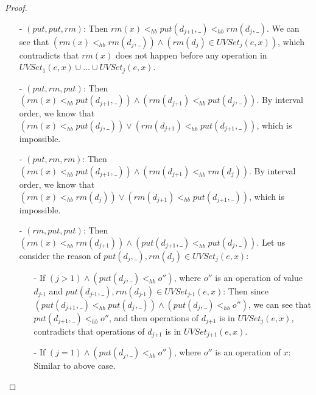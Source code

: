 \begin {proof}
\begin{itemize}
\item[-] $(\textit{put},\textit{put},\textit{rm})$: Then $\textit{rm}(x) <_{hb} \textit{put}(d_{\textit{j+1}},\_) <_{hb} \textit{rm}(d_j,\_)$. We can see that $( \textit{rm}(x) <_{hb} \textit{rm}(d_j,\_) ) \wedge ( \textit{rm}(d_j) \in \textit{UVSet}_j(e,x) )$, which contradicts that $\textit{rm}(x)$ does not happen before any operation in $\textit{UVSet}_1(e,x) \cup \ldots \cup \textit{UVSet}_j(e,x)$.

\item[-] $(\textit{put},\textit{rm},\textit{put})$: Then $( \textit{rm}(x) <_{hb} \textit{put}(d_{\textit{j+1}},\_) ) \wedge ( \textit{rm}(d_{\textit{j+1}}) <_{hb} \textit{put}(d_j,\_) )$. By interval order, we know that $( \textit{rm}(x) <_{hb} \textit{put}(d_j,\_) ) \vee ( \textit{rm}(d_{\textit{j+1}}) <_{hb} \textit{put}(d_{\textit{j+1}},\_) )$, which is impossible.

\item[-] $(\textit{put},\textit{rm},\textit{rm})$: Then $( \textit{rm}(x) <_{hb} \textit{put}(d_{\textit{j+1}},\_) ) \wedge ( \textit{rm}(d_{\textit{j+1}}) <_{hb} \textit{rm}(d_j) )$. By interval order, we know that $( \textit{rm}(x) <_{hb} \textit{rm}(d_j) ) \vee ( \textit{rm}(d_{\textit{j+1}}) <_{hb} \textit{put}(d_{\textit{j+1}},\_) )$, which is impossible.

\item[-] $(\textit{rm},\textit{put},\textit{put})$: Then $( \textit{rm}(x) <_{hb} \textit{rm}(d_{\textit{j+1}}) ) \wedge ( \textit{put}(d_{\textit{j+1}},\_) <_{hb} \textit{put}(d_j,\_) )$. Let us consider the reason of $\textit{put}(d_j,\_), \textit{rm}(d_j) \in \textit{UVSet}_j(e,x)$:
    \begin{itemize}
    \setlength{\itemsep}{0.5pt}
    \item[-] If $( j > 1 ) \wedge ( \textit{put}(d_j,\_) <_{hb} o'' )$, where $o''$ is an operation of value $d_{\textit{j-1}}$ and $\textit{put}(d_{\textit{j-1}},\_), \textit{rm}(d_{\textit{j-1}}) \in \textit{UVSet}_{\textit{j-1}}(e,x)$: Then since $( \textit{put}(d_{\textit{j+1}},\_) <_{hb} \textit{put}(d_j,\_) ) \wedge ( \textit{put}(d_j,\_) <_{hb} o'' )$, we can see that $\textit{put}(d_{\textit{j+1}},\_) <_{hb} o''$, and then operations of $d_{\textit{j+1}}$ is in $\textit{UVSet}_j(e,x)$, contradicts that operations of $d_{\textit{j+1}}$ is in $\textit{UVSet}_{\textit{j+1}}(e,x)$.

    \item[-] If $( j = 1 ) \wedge ( \textit{put}(d_j,\_) <_{hb} o'' )$, where $o''$ is an operation of $x$: Similar to above case.


\end{itemize}
\end{itemize}
\end{proof}
